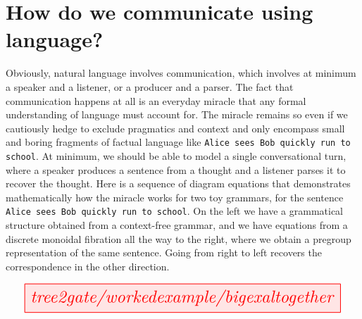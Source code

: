 \section{How do we communicate using language?}

 Obviously, natural language involves communication, which involves at minimum a speaker and a listener, or a producer and a parser. The fact that communication happens at all is an everyday miracle that any formal understanding of language must account for. The miracle remains so even if we cautiously hedge to exclude pragmatics and context and only encompass small and boring fragments of factual language like \texttt{Alice sees Bob quickly run to school}. At minimum, we should be able to model a single conversational turn, where a speaker produces a sentence from a thought and a listener parses it to recover the thought. Here is a sequence of diagram equations that demonstrates mathematically how the miracle works for two toy grammars, for the sentence \texttt{Alice sees Bob quickly run to school}. On the left we have a grammatical structure obtained from a context-free grammar, and we have equations from a discrete monoidal fibration all the way to the right, where we obtain a pregroup representation of the same sentence. Going from right to left recovers the correspondence in the other direction.

\[\resizebox{\textwidth}{!}{\tikzfig{tree2gate/workedexample/bigexaltogether}}\]

